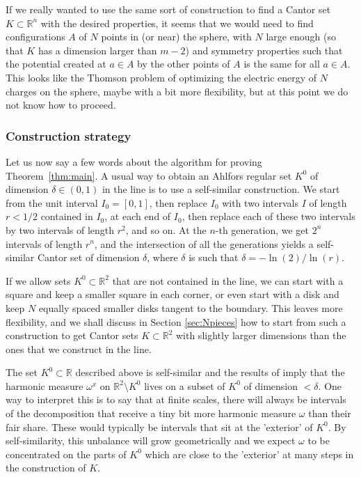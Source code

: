 \documentclass[10pt]{amsart}
\let\sm\setminus
\numberwithin{equation}{section}
\theoremstyle{plain}
\theoremstyle{definition}
\newcommand{\R}{\mathbb{R}}
\begin{document}
If we really wanted to use the same sort of construction to find a Cantor set
$K \subset \R^n$ with the desired properties, it seems that we would need to find
configurations $A$ of $N$ points in (or near) the sphere, with $N$ large enough
(so that $K$ has a dimension larger than $m-2$) and symmetry properties such that
the potential created at $a\in A$ by the other points of $A$ is the same for all $a \in A$.
This looks like the Thomson problem of optimizing the electric energy of $N$ charges on the sphere,
maybe with a bit more flexibility, but at this point we do not know how to proceed.

\subsubsection*{Construction strategy}

Let us now say a few words about the algorithm for proving Theorem~\ref{thm:main}.
A usual way to obtain an Ahlfors regular set $K^0$ of dimension
$\delta \in (0,1)$ in the line is to use a self-similar construction. We start from the
unit interval $I_0 = [0,1]$, then replace $I_0$ with two intervals $I$ of length $r < 1/2$
contained in $I_0$, at each end of $I_0$, then replace each of these two intervals by
two intervals of length $r^2$, and so on. At the $n$-th generation,
we get $2^n$ intervals of length $r^n$, and the intersection of all the generations yields a self-similar Cantor set of dimension $\delta$, where $\delta$ is such that $\delta = -\ln(2)/\ln(r)$.

If we allow sets $K^0 \subset \R^2$ that are not contained in the line,
we can start with a square and keep a smaller square in each corner, or even start with a disk and keep
$N$ equally spaced smaller disks tangent to the boundary. This leaves more flexibility, and we shall discuss in
Section \ref{sec:Npieces} how to start from such a construction to get Cantor sets $K \subset \R^2$ with slightly
larger dimensions than the ones that we construct in the line.

The set $K^0 \subset \R$ described above is self-similar and the results of \cite{BatakisZdunik2015}
imply that the harmonic measure $\omega^x$ on $\R^2 \sm K^0$
lives on a subset of $K^0$ of dimension $< \delta$. One way to interpret this is to say that
at finite scales, there will always be intervals of the decomposition that receive
a tiny bit more harmonic measure $\omega$ than their fair share.
These would typically be intervals that sit at the 'exterior' of $K^0$.
By self-similarity, this unbalance will grow geometrically and we expect $\omega$
to be concentrated on the parts of $K^0$ which are close to the 'exterior' at many steps in the construction of $K$.
\end{document}
